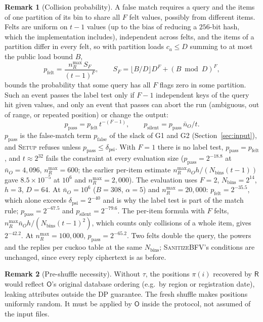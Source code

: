 \documentclass[11pt]{article}
\theoremstyle{definition}
\newtheorem{remark}{Remark}[section]
\theoremstyle{plain}
\newcommand{\Party}[1]{\textsf{#1}}
\newcommand{\Rp}{\Party{R}}
\newcommand{\Op}{\Party{O}}
\begin{document}
\begin{remark}[Collision probability]
A false match requires a query and the items of one partition of its bin to share all $F$ felt values, possibly from different items. Felts are uniform on $t - 1$ values (up to the bias of reducing a $256$-bit hash, which the implementation includes), independent across felts, and the items of a partition differ in every felt, so with partition loads $c_a \le D$ summing to at most the public load bound $B$,
\[
  p_{\mathrm{felt}} = \frac{n_R^{\max}\, S_F}{(t - 1)^F}, \qquad S_F = \lfloor B/D \rfloor D^F + (B \bmod D)^F,
\]
bounds the probability that some query has all $F$ flags zero in some partition. Such an event passes the label test only if $F - 1$ independent keys of the query hit given values, and only an event that passes can abort the run (ambiguous, out of range, or repeated position) or change the output:
\[
  p_{\mathrm{pass}} = p_{\mathrm{felt}}\, t^{-(F - 1)}, \qquad p_{\mathrm{silent}} = p_{\mathrm{pass}}\, \bar n_O / t .
\]
$p_{\mathrm{pass}}$ is the false-match term $p_{\mathrm{false}}$ of the slack of G1 and G2 (Section~\ref{sec:input}), and \textsc{Setup} refuses unless $p_{\mathrm{pass}} \le \delta_{\mathrm{psi}}$. With $F = 1$ there is no label test, $p_{\mathrm{pass}} = p_{\mathrm{felt}}$, and $t \approx 2^{32}$ fails the constraint at every evaluation size ($p_{\mathrm{pass}} = 2^{-18.8}$ at $\bar n_O = 4{,}096$, $n_R^{\max} = 600$; the earlier per-item estimate $n_R^{\max}\bar n_O h/(N_{\mathrm{bins}}(t-1))$ gave $8.5 \times 10^{-5}$ at $10^6$ and $n_R^{\max} = 2{,}000$). The evaluation uses $F = 2$, $N_{\mathrm{bins}} = 2^{14}$, $h = 3$, $D = 64$. At $\bar n_O = 10^6$ ($B = 308$, $\alpha = 5$) and $n_R^{\max} = 20{,}000$: $p_{\mathrm{felt}} = 2^{-35.5}$, which alone exceeds $\delta_{\mathrm{psi}} = 2^{-40}$ and is why the label test is part of the match rule; $p_{\mathrm{pass}} = 2^{-67.5}$ and $p_{\mathrm{silent}} = 2^{-79.6}$. The per-item formula with $F$ felts, $n_R^{\max}\bar n_O h/(N_{\mathrm{bins}}(t-1)^2)$, which counts only collisions of a whole item, gives $2^{-42.2}$. At $n_R^{\max} = 100{,}000$, $p_{\mathrm{pass}} = 2^{-65.2}$. Two felts double the query, the powers and the replies per cuckoo table at the same $N_{\mathrm{bins}}$; \textsc{SanitizeBFV}'s conditions are unchanged, since every reply ciphertext is as before.
\end{remark}

\begin{remark}[Pre-shuffle necessity]
Without $\tau$, the positions $\pi(i)$ recovered by $\Rp$ would reflect $\Op$'s original database ordering (e.g.\ by region or registration date), leaking attributes outside the DP guarantee. The fresh shuffle makes positions uniformly random. It must be applied by $\Op$ inside the protocol, not assumed of the input files.
\end{remark}
\end{document}
